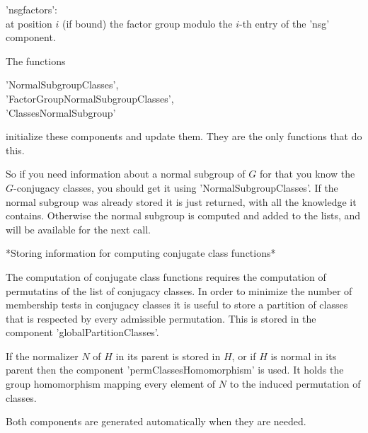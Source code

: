 'nsgfactors': \\ at position $i$ (if bound) the factor group
                 modulo the $i$-th entry of the 'nsg' component.

The functions

'NormalSubgroupClasses',\\
'FactorGroupNormalSubgroupClasses',\\
'ClassesNormalSubgroup'

initialize these components and update them.
They are the only functions that do this.

So if you need information about a normal subgroup of $G$ for that you know
the $G$-conjugacy classes, you should get it using 'NormalSubgroupClasses'.
If the normal subgroup was already stored it is just returned, with all the
knowledge it contains.  Otherwise the normal subgroup is computed and
added to the lists, and will be available for the next call.

\vspace{3mm}

*Storing information for computing conjugate class functions*

The computation of conjugate class functions requires the computation of
permutatins of the list of conjugacy classes.  In order to minimize the
number of membership tests in conjugacy classes it is useful to store
a partition of classes that is respected by every admissible permutation.
This is stored in the component 'globalPartitionClasses'.

If the normalizer $N$ of $H$ in its parent is stored in $H$, or if $H$ is
normal in its parent then the component 'permClassesHomomorphism' is used.
It holds the group homomorphism mapping every element of $N$ to the
induced permutation of classes.

Both components are generated automatically when they are needed.

% 
% 
% 

